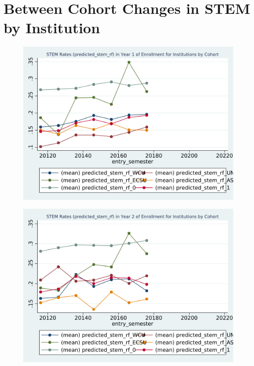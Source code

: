 \section{Between Cohort Changes in STEM by Institution}

\newpage
\begin{figure}[h!]
\begin{centering}
\includegraphics[scale=1]{"figures/predicted_stem_rf_by_entry_1_INSTITUTION_STEM"}
\end{centering}
\end{figure}
\newpage
\begin{figure}[h!]
\begin{centering}
\includegraphics[scale=1]{"figures/predicted_stem_rf_by_entry_2_INSTITUTION_STEM"}
\end{centering}
\end{figure}
